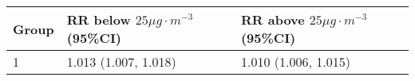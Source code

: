 \begin{tabular}{lll}
  \hline
Group & RR below $25 \mu g \cdot m^{-3}$ (95\%CI) & RR above $25 \mu g \cdot m^{-3}$ (95\%CI) \\ 
  \hline
   1 & 1.013 (1.007, 1.018) & 1.010 (1.006, 1.015) \\ 
   \hline
\end{tabular}


